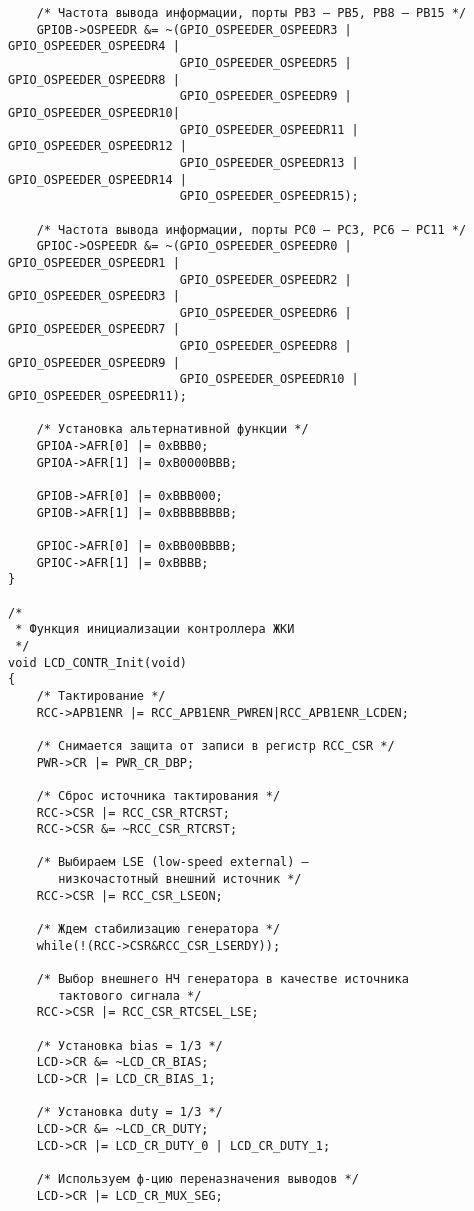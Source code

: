 \begin{verbatim}
    /* Частота вывода информации, порты PB3 – PB5, PB8 – PB15 */
    GPIOB->OSPEEDR &= ~(GPIO_OSPEEDER_OSPEEDR3 | GPIO_OSPEEDER_OSPEEDR4 | 
                        GPIO_OSPEEDER_OSPEEDR5 | GPIO_OSPEEDER_OSPEEDR8 | 
                        GPIO_OSPEEDER_OSPEEDR9 | GPIO_OSPEEDER_OSPEEDR10| 
                        GPIO_OSPEEDER_OSPEEDR11 | GPIO_OSPEEDER_OSPEEDR12 |
                        GPIO_OSPEEDER_OSPEEDR13 | GPIO_OSPEEDER_OSPEEDR14 | 
                        GPIO_OSPEEDER_OSPEEDR15);

    /* Частота вывода информации, порты PC0 – PC3, PC6 – PC11 */
    GPIOC->OSPEEDR &= ~(GPIO_OSPEEDER_OSPEEDR0 | GPIO_OSPEEDER_OSPEEDR1 | 
                        GPIO_OSPEEDER_OSPEEDR2 | GPIO_OSPEEDER_OSPEEDR3 |
                        GPIO_OSPEEDER_OSPEEDR6 | GPIO_OSPEEDER_OSPEEDR7 | 
                        GPIO_OSPEEDER_OSPEEDR8 | GPIO_OSPEEDER_OSPEEDR9 |  
                        GPIO_OSPEEDER_OSPEEDR10 | GPIO_OSPEEDER_OSPEEDR11);

    /* Установка альтернативной функции */
    GPIOA->AFR[0] |= 0xBBB0;
    GPIOA->AFR[1] |= 0xB0000BBB;

    GPIOB->AFR[0] |= 0xBBB000;
    GPIOB->AFR[1] |= 0xBBBBBBBB;

    GPIOC->AFR[0] |= 0xBB00BBBB;
    GPIOC->AFR[1] |= 0xBBBB;
}

/*
 * Функция инициализации контроллера ЖКИ
 */
void LCD_CONTR_Init(void)
{
    /* Тактирование */
    RCC->APB1ENR |= RCC_APB1ENR_PWREN|RCC_APB1ENR_LCDEN;

    /* Снимается защита от записи в регистр RCC_CSR */
    PWR->CR |= PWR_CR_DBP;

    /* Сброс источника тактирования */
    RCC->CSR |= RCC_CSR_RTCRST;
    RCC->CSR &= ~RCC_CSR_RTCRST;

    /* Выбираем LSE (low-speed external) — 
       низкочастотный внешний источник */
    RCC->CSR |= RCC_CSR_LSEON;

    /* Ждем стабилизацию генератора */
    while(!(RCC->CSR&RCC_CSR_LSERDY));

    /* Выбор внешнего НЧ генератора в качестве источника 
       тактового сигнала */
    RCC->CSR |= RCC_CSR_RTCSEL_LSE;

    /* Установка bias = 1/3 */
    LCD->CR &= ~LCD_CR_BIAS;
    LCD->CR |= LCD_CR_BIAS_1;

    /* Установка duty = 1/3 */
    LCD->CR &= ~LCD_CR_DUTY;
    LCD->CR |= LCD_CR_DUTY_0 | LCD_CR_DUTY_1;

    /* Используем ф-цию переназначения выводов */
    LCD->CR |= LCD_CR_MUX_SEG;


\end{verbatim}
